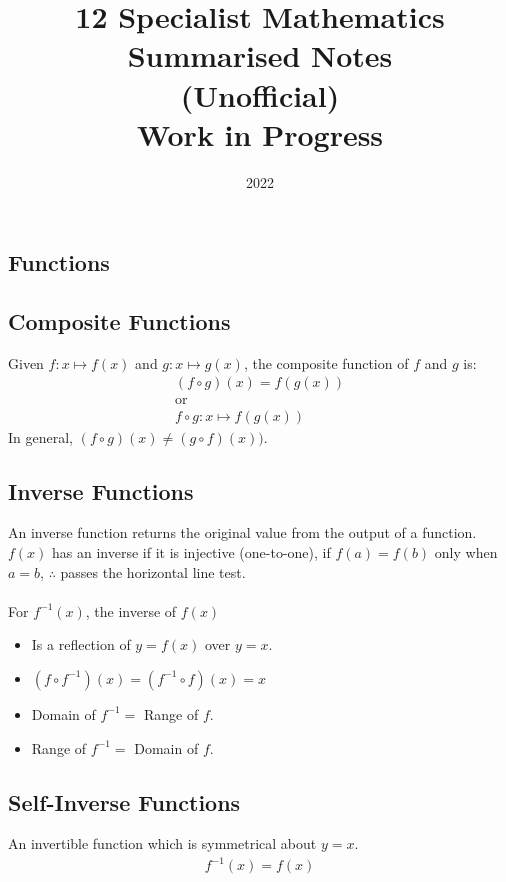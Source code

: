 \documentclass[10pt, a4paper, titlepage]{article}
\title{12 Specialist Mathematics Summarised Notes \\ (Unofficial) \\ Work in Progress}
\author{}
\date{2022}
\begin{document}
\maketitle
\begin{multicols*}{3}

\section{Functions}
	\subsection{Composite Functions}
	Given $f:x\mapsto f(x)$ and $g:x\mapsto g(x)$, the composite function of $f$ and $g$ is:
	\begin{gather}
		(f\circ g)(x)=f(g(x))\\
		\text{or}\\
		f\circ g:x\mapsto f(g(x))
	\end{gather}
	In general, $(f\circ g)(x)\neq (g\circ f)(x))$.

	\dotfill
	\subsection{Inverse Functions}
	An inverse function returns the original value from the output of a function.\\
	$f(x)$ has an inverse if it is injective (one-to-one), if $f(a)=f(b)$ only when $a=b$, $\therefore$ passes the horizontal line test.\\\\
	For $f^{-1}(x)$, the inverse of $f(x)$
	\begin{itemize}
		\item Is a reflection of $y=f(x)$ over $y=x$.
		\item $(f\circ f^{-1})(x)=(f^{-1}\circ f)(x)=x$
		\item Domain of $f^{-1}=$ Range of $f$.
		\item Range of $f^{-1}=$ Domain of $f$.
	\end{itemize}

	\dotfill
	\subsection{Self-Inverse Functions}
	An invertible function which is symmetrical about $y=x$.
	\begin{align}
		f^{-1}(x)=f(x)
	\end{align}

	\dotfill

\end{multicols*}
\end{document}
